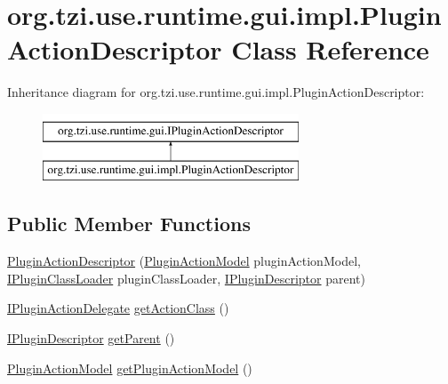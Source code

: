 \hypertarget{classorg_1_1tzi_1_1use_1_1runtime_1_1gui_1_1impl_1_1_plugin_action_descriptor}{\section{org.\-tzi.\-use.\-runtime.\-gui.\-impl.\-Plugin\-Action\-Descriptor Class Reference}
\label{classorg_1_1tzi_1_1use_1_1runtime_1_1gui_1_1impl_1_1_plugin_action_descriptor}
}
Inheritance diagram for org.\-tzi.\-use.\-runtime.\-gui.\-impl.\-Plugin\-Action\-Descriptor\-:\begin{figure}[H]
\begin{center}
\leavevmode
\includegraphics[height=2.000000cm]{classorg_1_1tzi_1_1use_1_1runtime_1_1gui_1_1impl_1_1_plugin_action_descriptor}
\end{center}
\end{figure}
\subsection*{Public Member Functions}
\begin{DoxyCompactItemize}
\item 
\hyperlink{classorg_1_1tzi_1_1use_1_1runtime_1_1gui_1_1impl_1_1_plugin_action_descriptor_ab33015412e4f952c2c98db452eb9358d}{Plugin\-Action\-Descriptor} (\hyperlink{classorg_1_1tzi_1_1use_1_1runtime_1_1model_1_1_plugin_action_model}{Plugin\-Action\-Model} plugin\-Action\-Model, \hyperlink{interfaceorg_1_1tzi_1_1use_1_1runtime_1_1_i_plugin_class_loader}{I\-Plugin\-Class\-Loader} plugin\-Class\-Loader, \hyperlink{interfaceorg_1_1tzi_1_1use_1_1runtime_1_1_i_plugin_descriptor}{I\-Plugin\-Descriptor} parent)
\item 
\hyperlink{interfaceorg_1_1tzi_1_1use_1_1runtime_1_1gui_1_1_i_plugin_action_delegate}{I\-Plugin\-Action\-Delegate} \hyperlink{classorg_1_1tzi_1_1use_1_1runtime_1_1gui_1_1impl_1_1_plugin_action_descriptor_a2e673a31de93415b4cacf0812aa91d25}{get\-Action\-Class} ()
\item 
\hyperlink{interfaceorg_1_1tzi_1_1use_1_1runtime_1_1_i_plugin_descriptor}{I\-Plugin\-Descriptor} \hyperlink{classorg_1_1tzi_1_1use_1_1runtime_1_1gui_1_1impl_1_1_plugin_action_descriptor_af3725c810327459395a86408e4c2d052}{get\-Parent} ()
\item 
\hyperlink{classorg_1_1tzi_1_1use_1_1runtime_1_1model_1_1_plugin_action_model}{Plugin\-Action\-Model} \hyperlink{classorg_1_1tzi_1_1use_1_1runtime_1_1gui_1_1impl_1_1_plugin_action_descriptor_a2aa62e4800ea85d04c5a788d84f374e0}{get\-Plugin\-Action\-Model} ()
\end{DoxyCompactItemize}


